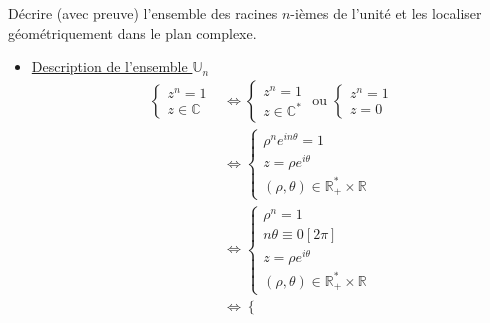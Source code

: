 \documentclass{article}
\renewenvironment{question_kholle}[2][ ]
{
	\subsection{\texorpdfstring{#2}{}}
	\notblank{#1}
	{
		\noindent #1
		\bigbreak
	}
	{}
	\begin{proof}
}
{
	\end{proof}
}
\begin{document}
\pagebreak
\begin{question_kholle}{Décrire (avec preuve) l'ensemble des racines $n$-ièmes de l'unité et les localiser géométriquement dans le plan complexe.}
  \begin{itemize}
    \item \underline{Description de l'ensemble $\mathbb U _n$}
          \begin{align*}
            \left\{ \begin{array}{ll}
                      z^{n}=1 \\
                      z \in \mathbb{C}
                    \end{array}\right.
             & \iff
            \left\{ \begin{array}{ll}
                      z^{n} = 1 \\
                      z \in \mathbb{C}^{*}
                    \end{array}\right. \text{ ou }
            \left\{ \begin{array}{ll}
                      z^{n} = 1 \\
                      z = 0
                    \end{array}\right.                                               \\
             & \iff
            \left\{ \begin{array}{ll}
                      \rho^{n}e^{in \theta}  = 1 \\
                      z = \rho e^{i \theta}      \\
                      (\rho, \theta) \in \mathbb{R}_{+}^{*}\times \mathbb{R}
                    \end{array}\right.
            \\ & \iff
            \left\{ \begin{array}{ll}
                      \rho^{n} = 1              \\
                      n \theta \equiv 0 [2 \pi] \\
                      z = \rho e^{i \theta}     \\
                      (\rho, \theta) \in \mathbb{R}_{+}^{*}\times \mathbb{R}
                    \end{array}\right.
            \\ & \iff
            \left\{ \begin{array}{ll}

\end{array}
\end{align*}
\end{itemize}
\end{question_kholle}
\end{document}
